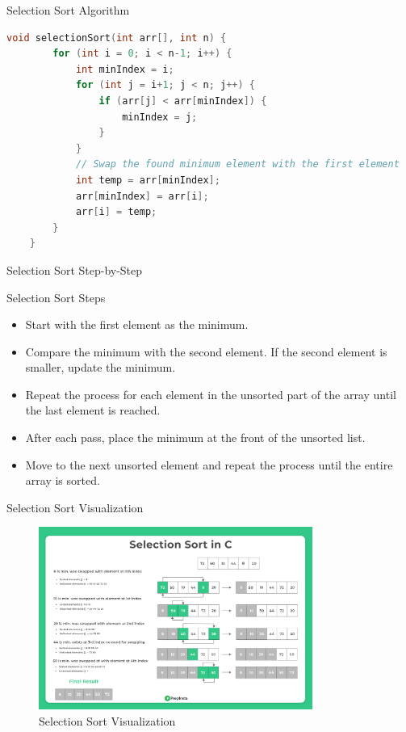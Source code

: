 \documentclass{beamer}
\newenvironment{customblock}[1]
  {\begin{block}{#1}\begin{flushleft}\ttfamily}
  {\end{flushleft}\end{block}}
\begin{document}
\begin{frame}[fragile]{Selection Sort Algorithm}
  \begin{lstlisting}[language=C++]
    void selectionSort(int arr[], int n) {
        for (int i = 0; i < n-1; i++) {
            int minIndex = i;
            for (int j = i+1; j < n; j++) {
                if (arr[j] < arr[minIndex]) {
                    minIndex = j;
                }
            }
            // Swap the found minimum element with the first element
            int temp = arr[minIndex];
            arr[minIndex] = arr[i];
            arr[i] = temp;
        }
    }
    \end{lstlisting}
\end{frame}

\begin{frame}{Selection Sort Step-by-Step}
  \begin{customblock}{Selection Sort Steps}
    \begin{itemize}
      \item Start with the first element as the minimum.
      \item Compare the minimum with the second element. If the second element is smaller, update the minimum.
      \item Repeat the process for each element in the unsorted part of the array until the last element is reached.
      \item After each pass, place the minimum at the front of the unsorted list.
      \item Move to the next unsorted element and repeat the process until the entire array is sorted.
    \end{itemize}
  \end{customblock}
\end{frame}


\begin{frame}{Selection Sort Visualization}
  \begin{figure}
    \includegraphics[width=0.8\textwidth]{graphics/Selection-sort1.png}
    \caption{Selection Sort Visualization}
  \end{figure}
\end{frame}
\end{document}

